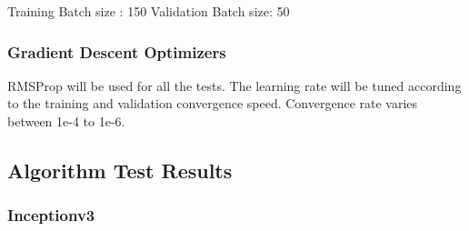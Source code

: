 \documentclass{IEEEtran}
\begin{document}
Training Batch size : 150
Validation Batch size: 50

\subsubsection{Gradient Descent Optimizers}

RMSProp will be used for all the tests. The learning rate will be tuned according to the training and validation convergence speed. Convergence rate varies between 1e-4 to 1e-6.


\subsection{Algorithm Test Results}

\subsubsection{Inceptionv3}
\end{document}
